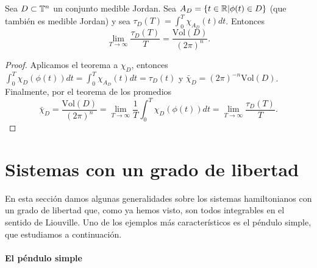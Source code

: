 \begin{corol}
  Sea $D\subset \mathbb{T}^n$ un conjunto medible Jordan. Sea $A_D=\{t\in \mathbb{R} | \phi(t) \in D\}$ (que también es medible Jordan) y sea $\tau_D(T)=\int_0^T\chi_{A_D}(t)dt$. Entonces
  \begin{equation*}
    \lim_{T\rightarrow \infty}\frac{\tau_D(T)}{T}= \frac{\mathrm{Vol}(D)}{(2\pi)^n}.
  \end{equation*}
\end{corol}
\begin{proof}
  Aplicamos el teorema a $\chi_D$, entonces $\int_0^T \chi_D(\phi(t))dt=\int_0^T \chi_{A_D}(t)dt=\tau_D(t)$ y $\bar{\chi}_D=(2\pi)^{-n}\mathrm{Vol}(D)$. Finalmente, por el teorema de los promedios
  \begin{equation*}
    \bar{\chi}_D=\frac{\mathrm{Vol}(D)}{(2\pi)^n}=\lim_{T\rightarrow \infty}\frac{1}{T}\int_0^T \chi_D(\phi(t))dt=\lim_{T\rightarrow \infty}\frac{\tau_D(T)}{T}.
  \end{equation*}
\end{proof}
\section{Sistemas con un grado de libertad}
En esta sección damos algunas generalidades sobre los sistemas hamiltonianos con un grado de libertad que, como ya hemos visto, son todos integrables en el sentido de Liouville. Uno de los ejemplos más característicos es el péndulo simple, que estudiamos a continuación.
  
\paragraph{\bf El péndulo simple}\mbox{}
  
